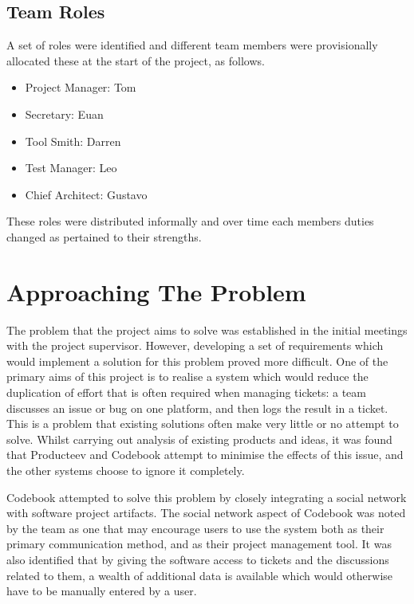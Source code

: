 \documentclass[a4paper]{l3proj}
\begin{document}
\subsection{Team Roles}
\label{roles}

A set of roles were identified and different team members were provisionally allocated these at the start of the project, as follows.

\begin{itemize}
\item Project Manager: Tom
\item Secretary: Euan
\item Tool Smith: Darren
\item Test Manager: Leo
\item Chief Architect: Gustavo
\end{itemize}

These roles were distributed informally and over time each members duties changed as pertained to their strengths.

\section{Approaching The Problem}
\label{requirements}

The problem that the project aims to solve was established in the initial meetings with the project supervisor. However, developing a set of requirements which would implement a solution for this problem proved more difficult. One of the primary aims of this project is to realise a system which would reduce the duplication of effort that is often required when managing tickets: a team discusses an issue or bug on one platform, and then logs the result in a ticket. This is a problem that existing solutions often make very little or no attempt to solve. Whilst carrying out analysis of existing products and ideas, it was found that Producteev and Codebook attempt to minimise the effects of this issue, and the other systems choose to ignore it completely.

Codebook attempted to solve this problem by closely integrating a social network with software project artifacts. The social network aspect of Codebook was noted by the team as one that may encourage users to use the system both as their primary communication method, and as their project management tool. It was also identified that by giving the software access to tickets and the discussions related to them, a wealth of additional data is available which would otherwise have to be manually entered by a user.
\end{document}
